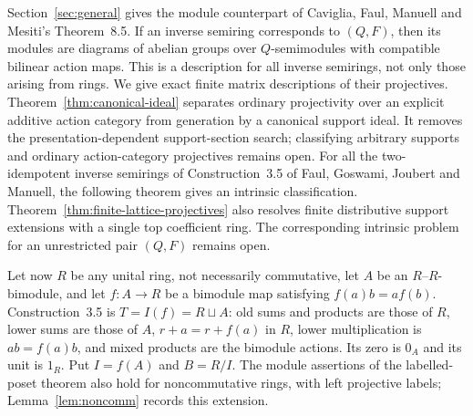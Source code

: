 \documentclass[11pt]{amsart}
\theoremstyle{definition}
\theoremstyle{remark}
\begin{document}
Section~\ref{sec:general} gives the module counterpart of Caviglia, Faul, Manuell and Mesiti's Theorem~8.5. If an inverse semiring corresponds to $(Q,F)$, then its modules are diagrams of abelian groups over $Q$-semimodules with compatible bilinear action maps. This is a description for all inverse semirings, not only those arising from rings. We give exact finite matrix descriptions of their projectives. Theorem~\ref{thm:canonical-ideal} separates ordinary projectivity over an explicit additive action category from generation by a canonical support ideal. It removes the presentation-dependent support-section search; classifying arbitrary supports and ordinary action-category projectives remains open. For all the two-idempotent inverse semirings of Construction~3.5 of Faul, Goswami, Joubert and Manuell, the following theorem gives an intrinsic classification. Theorem~\ref{thm:finite-lattice-projectives} also resolves finite distributive support extensions with a single top coefficient ring. The corresponding intrinsic problem for an unrestricted pair $(Q,F)$ remains open.

Let now $R$ be any unital ring, not necessarily commutative, let $A$ be an $R$--$R$-bimodule, and let $f:A\to R$ be a bimodule map satisfying $f(a)b=af(b)$. Construction~3.5 is $T=I(f)=R\sqcup A$: old sums and products are those of $R$, lower sums are those of $A$, $r+a=r+f(a)$ in $R$, lower multiplication is $ab=f(a)b$, and mixed products are the bimodule actions. Its zero is $0_A$ and its unit is $1_R$. Put $I=f(A)$ and $B=R/I$. The module assertions of the labelled-poset theorem also hold for noncommutative rings, with left projective labels; Lemma~\ref{lem:noncomm} records this extension.
\end{document}

